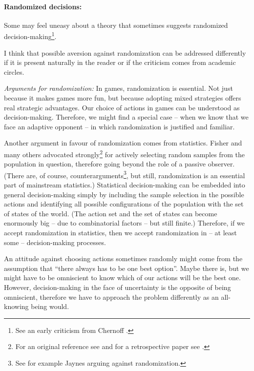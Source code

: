 \documentclass{article}
\begin{document}
\paragraph{Randomized decisions:}
Some may feel uneasy about a theory that sometimes suggests randomized decision-making\footnote{See an early criticism from Chernoff \cite{paper:Chernoff1954}.}.

I think that possible aversion against randomization can be addressed differently if it is present naturally in the reader or if the criticism comes from academic circles.

{\it Arguments for randomization:}
In games, randomization is essential. Not just because it makes games more fun, but because adopting mixed strategies offers real strategic advantages.
Our choice of actions in games can be understood as decision-making. Therefore, we might find a special case -- when we know that we face an adaptive opponent -- in which randomization is justified and familiar.

Another argument in favour of randomization comes from statistics. Fisher and many others advocated strongly\footnote{For an original reference see \cite{book:FisherDesignOfExperiments} and for a retrospective paper see \cite{paper:FishersDevil}.} for actively selecting random samples from the population in question, therefore going beyond the role of a passive observer. (There are, of course, counterarguments\footnote{See for example Jaynes \cite{book:Jaynes} arguing against randomization.}, but still, randomization is an essential part of mainstream statistics.)
Statistical decision-making can be embedded into general decision-making simply by including the sample selection in the possible actions and identifying all possible configurations of the population with the set of states of the world. (The action set and the set of states can become enormously big -- due to combinatorial factors -- but still finite.) Therefore, if we accept randomization in statistics, then we accept randomization in -- at least some -- decision-making processes.

An attitude against choosing actions sometimes randomly might come from the assumption that ``there always has to be one best option''. Maybe there is, but we might have to be omniscient to know which of our actions will be the best one. However, decision-making in the face of uncertainty is the opposite of being omniscient, therefore we have to approach the problem differently as an all-knowing being would.
\end{document}
